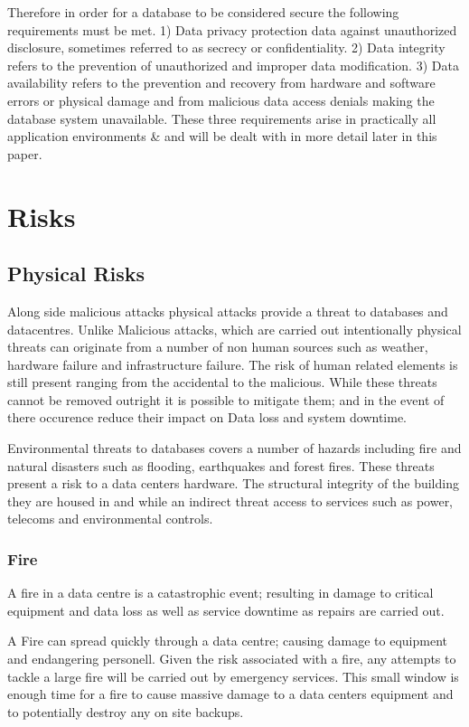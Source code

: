 \documentclass[11pt]{article}
\begin{document}
Therefore in order for a database to be considered secure the following requirements must be met.  1) Data privacy protection data against unauthorized disclosure, sometimes referred to as secrecy or confidentiality.  2) Data integrity refers to the prevention of unauthorized and improper data modification.  3) Data availability refers to the prevention and recovery from hardware and software errors or physical damage and from malicious data access denials making the database system unavailable. These three requirements arise in practically all application environments \cite{BerSand}\&\cite{Thur} and will be dealt with in more detail later in this paper.


\section{Risks}

\subsection{Physical Risks}
Along side malicious attacks physical attacks provide a threat to databases and datacentres. Unlike Malicious attacks, which are carried out intentionally physical threats can originate from a number of non human sources such as weather, hardware failure and infrastructure failure. The risk of human related elements is still present ranging from the accidental to the malicious.  While these threats cannot be removed outright it is possible to mitigate them; and in the event of there occurence reduce their impact on Data loss and system downtime.	 


Environmental threats to databases covers a number of hazards including fire  and natural disasters such as flooding, earthquakes and forest fires.  These threats present a risk to a data centers hardware.  The structural integrity of the building they are housed in and while an indirect threat access to services such as power, telecoms and environmental controls.

\subsubsection{Fire}
A fire in a data centre is a catastrophic event; resulting in damage to critical equipment and data loss as well as service downtime as repairs are carried out.

A Fire can spread quickly through a data centre; causing damage to equipment and endangering personell. Given the risk associated with a fire, any attempts to tackle a large fire will be carried out by emergency services.  This small window is enough time for a fire to cause massive damage to a data centers equipment and to potentially destroy any on site backups.
\end{document}
